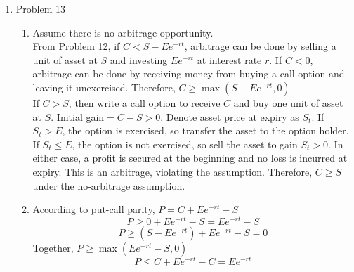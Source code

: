 \documentclass[leqno,12pt]{article}
\begin{document}
\begin{enumerate}
\pagebreak

\item Problem 13
\begin{enumerate}
\item Assume there is no arbitrage opportunity.\\
From Problem 12, if $C<S-Ee^{-rt}$, arbitrage can be done by selling a unit of asset at $S$ and investing $Ee^{-rt}$ at interest rate $r$. If $C<0$, arbitrage can be done by receiving money from buying a call option and leaving it unexercised. Therefore, $C\geq\max(S-Ee^{-rt},0)$\\
If $C>S$, then write a call option to receive $C$ and buy one unit of asset at $S$. Initial gain$=C-S>0$. Denote asset price at expiry as $S_t$. If $S_t>E$, the option is exercised, so transfer the asset to the option holder. If $S_t\leq E$, the option is not exercised, so sell the asset to gain $S_t>0$. In either case, a profit is secured at the beginning and no loss is incurred at expiry. This is an arbitrage, violating the assumption. Therefore, $C\geq S$ under the no-arbitrage assumption.
\item According to put-call parity, $P=C+Ee^{-rt}-S$
\[P\geq 0+Ee^{-rt}-S=Ee^{-rt}-S \]
\[P\geq (S-Ee^{-rt})+Ee^{-rt}-S=0\]
Together, $P\geq\max(Ee^{-rt}-S,0)$
\[P\leq C+Ee^{-rt}-C=Ee^{-rt}\]\\
\end{enumerate}

\pagebreak


\end{enumerate}
\end{document}
